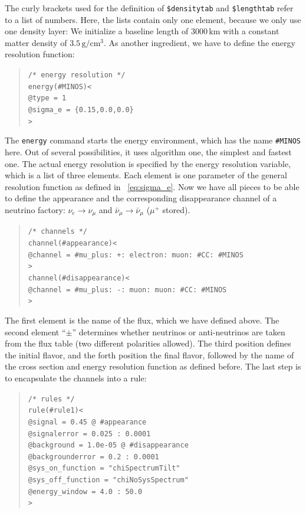 The curly brackets used for the definition of {\tt \$densitytab} and
{\tt \$lengthtab} refer to a list of numbers. Here, the lists contain only
one element, because we only use one density layer: We initialize a baseline length of $3000 \, \mathrm{km}$ with a constant matter density of $3.5 \, \mathrm{g/cm^3}$. 
%
As another ingredient, we have to define the energy resolution function:
\begin{quote}
{\tt /* energy resolution */}\\
{\tt energy(\#MINOS)<}\\
{\tt \tb @type = 1}\\
{\tt \tb @sigma\_e = \{0.15,0.0,0.0\}}\\
{\tt >}
\end{quote}
The {\tt energy} command starts the energy environment, which has the name 
{\tt \#MINOS} here. Out of several possibilities, it uses algorithm one,
the simplest and fastest one. The actual energy resolution is specified
by the energy resolution variable, which is a list of three elements. Each 
element is one parameter of the general resolution function as defined in 
\eq~\ref{eq:sigma_e}.
%
Now we have all pieces to be able to define the appearance and the corresponding disappearance channel of a neutrino factory: 
$\nu_e\rightarrow\nu_\mu$  and $\bar\nu_\mu\rightarrow\bar\nu_\mu$ 
($\mu^+$ stored).
\begin{quote}
{\tt /* channels */}\\
{\tt channel(\#appearance)<}\\
{\tt \tb @channel = \#mu\_plus: +: electron: muon: \#CC: \#MINOS}\\
{\tt >}\\
{\tt channel(\#disappearance)<}\\
{\tt \tb @channel = \#mu\_plus: -: muon: muon: \#CC: \#MINOS}\\
{\tt >}
\end{quote}
The first element is the name of the flux, which we have defined above. 
The second element ``$\pm$'' determines whether 
neutrinos or anti-neutrinos are taken from the flux table (two different polarities allowed). The third position defines the initial flavor,
and the forth position the final flavor, followed by the name of the cross
section and energy resolution function as defined before.
%
The last step is to encapsulate the channels into a rule:
\begin{quote}
{\tt /* rules */}\\
{\tt rule(\#rule1)<}\\
{\tt \tb @signal = 0.45 @ \#appearance}\\
{\tt \tb @signalerror = 0.025 : 0.0001}\\
{\tt \tb @background = 1.0e-05 @ \#disappearance}\\
{\tt \tb @backgrounderror = 0.2 : 0.0001}\\
{\tt \tb @sys\_on\_function = "chiSpectrumTilt"}\\
{\tt \tb @sys\_off\_function = "chiNoSysSpectrum"}\\
{\tt \tb @energy\_window = 4.0 : 50.0}\\
{\tt >}
\end{quote}
